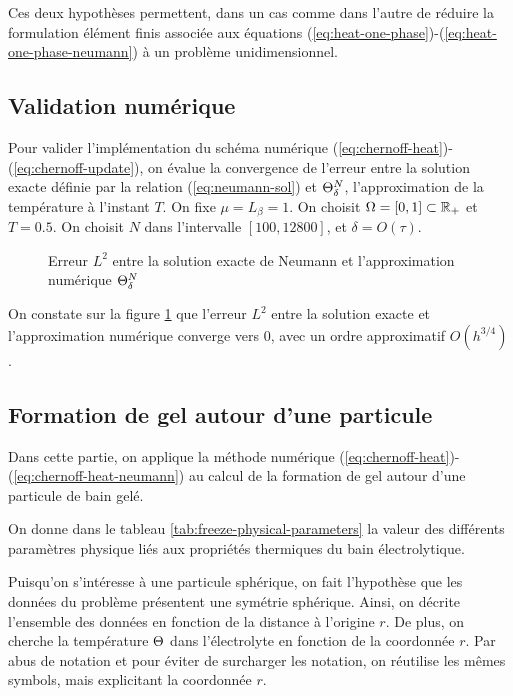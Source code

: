 Ces deux hypothèses permettent, dans un cas comme dans l'autre de
réduire la formulation élément finis associée aux équations
(\ref{eq:heat-one-phase})-(\ref{eq:heat-one-phase-neumann}) à un
problème unidimensionnel.



\subsection*{Validation numérique}
Pour valider l'implémentation du schéma numérique
(\ref{eq:chernoff-heat})-(\ref{eq:chernoff-update}), on évalue la
convergence de l'erreur entre la solution exacte définie par la
relation (\ref{eq:neumann-sol}) et $\Theta^N_\delta$,
l'approximation de la température à l'instant $T$. On fixe $\mu =
L_\beta = 1$. On choisit $\Omega = [0, 1] \subset \mathbb R_+$ et $T =
0.5$. On choisit $N$ dans l'intervalle $[100, 12800]$, et $\delta =
O(\tau)$.

\begin{figure}
  \begin{center}
    
    \caption{Erreur $L^2$ entre la solution exacte de Neumann et
      l'approximation numérique $\Theta^N_\delta$}
    \label{fig:neumann-convergence}
  \end{center}
\end{figure}

On constate sur la figure \ref{fig:neumann-convergence} que l'erreur
$L^2$ entre la solution exacte et l'approximation numérique converge
vers 0, avec un ordre approximatif $O(h^{3/4})$.




\subsection*{Formation de gel autour d'une particule}
Dans cette partie, on applique la méthode numérique
(\ref{eq:chernoff-heat})-(\ref{eq:chernoff-heat-neumann}) au calcul de
la formation de gel autour d'une particule de bain gelé.

On donne dans le tableau \ref{tab:freeze-physical-parameters} la
valeur des différents paramètres physique liés aux propriétés
thermiques du bain électrolytique.

Puisqu'on s'intéresse à une particule sphérique, on fait l'hypothèse
que les données du problème présentent une symétrie sphérique. Ainsi,
on décrite l'ensemble des données en fonction de la distance à
l'origine $r$. De plus, on cherche la température $\Theta$ dans
l'électrolyte en fonction de la coordonnée $r$. Par abus de notation
et pour éviter de surcharger les notation, on réutilise les mêmes
symbols, mais explicitant la coordonnée $r$.

